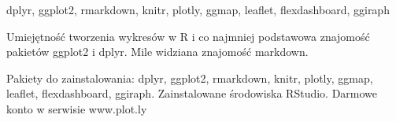 \documentclass[\main/boa.tex]{subfiles}
\begin{document}
\pakiety dplyr, ggplot2, rmarkdown, knitr, plotly, ggmap, leaflet, flexdashboard, ggiraph

\umiejetnosci Umiejętność tworzenia wykresów w R i co najmniej podstawowa znajomość pakietów ggplot2 i dplyr. Mile widziana znajomość markdown.

\wymagania Pakiety do zainstalowania: dplyr, ggplot2, rmarkdown, knitr, plotly, ggmap, leaflet, flexdashboard, ggiraph. Zainstalowane środowiska RStudio. Darmowe konto w serwisie www.plot.ly
\end{document}
